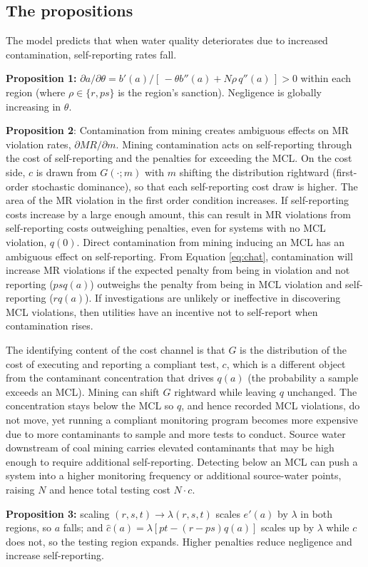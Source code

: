 \subsection{The propositions}

The model predicts that when water quality deteriorates due to increased contamination, self-reporting rates fall.

\textbf{Proposition 1:} $\partial a/\partial\theta = b'(a) / [\,-\theta b''(a) + N\rho\, q''(a)\,] > 0$ within each region (where $\rho \in \{r, ps\}$ is the region's sanction). Negligence is globally increasing in $\theta$.

\textbf{Proposition 2}: Contamination from mining creates ambiguous effects on MR violation rates, $\partial MR/\partial m$.
Mining contamination acts on self-reporting through the cost of self-reporting and the penalties for exceeding the MCL. On the cost side, $c$ is drawn from $G(\cdot;m)$ with $m$ shifting the distribution rightward (first-order stochastic dominance), so that each self-reporting cost draw is higher. The area of the MR violation in the first order condition increases. If self-reporting costs increase by a large enough amount, this can result in MR violations from self-reporting costs outweighing penalties, even for systems with no MCL violation, $q(0)$.
Direct contamination from mining inducing an MCL has an ambiguous effect on self-reporting. From Equation \ref{eq:chat}, contamination will increase MR violations if the expected penalty from being in violation and not reporting ($psq(a)$) outweighs the penalty from being in MCL violation and self-reporting ($rq(a)$). If investigations are unlikely or ineffective in discovering MCL violations, then utilities have an incentive not to self-report when contamination rises.

The identifying content of the cost channel is that $G$ is the distribution of the cost of executing and reporting a compliant test, $c$, which is a different object from the contaminant concentration that drives $q(a)$ (the probability a sample exceeds an MCL). Mining can shift $G$ rightward while leaving $q$ unchanged. The concentration stays below the MCL so $q$, and hence recorded MCL violations, do not move, yet running a compliant monitoring program becomes more expensive due to more contaminants to sample and more tests to conduct. Source water downstream of coal mining carries elevated contaminants that may be high enough to require additional self-reporting. Detecting below an MCL can push a system into a higher monitoring frequency or additional source-water points, raising $N$ and hence total testing cost $N\cdot c$.

\textbf{Proposition 3:} scaling $(r,s,t) \to \lambda(r,s,t)$ scales $e'(a)$ by $\lambda$ in both regions, so $a$ falls; and $\hat{c}(a) = \lambda\left[pt - (r-ps)q(a)\right]$ scales up by $\lambda$ while $c$ does not, so the testing region expands. Higher penalties reduce negligence and increase self-reporting.